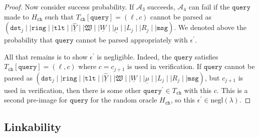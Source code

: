 \documentclass[11pt]{article}
\theoremstyle{definition}
\newcommand{\tlt}{\texttt{tlt}}
\newcommand{\tvk}{\texttt{tvk}}
\newcommand{\ring}{\texttt{ring}}
\newcommand{\secpar}{\lambda}
\newcommand{\msg}{\texttt{msg}}
\newcommand{\negl}{\text{negl}(\secpar)}
\newcommand{\keyOracle}{\mathcal{O}_{\texttt{key}}}
\newcommand{\signaturequery}{(\texttt{dst}_{j} \mid \mid \ring \mid \mid \tlt \mid \mid \underline{\widehat{Y}} \mid \mid \mathfrak{W} \mid \mid \underline{W} \mid \mid \underline{\mu} \mid \mid L_{j} \mid \mid R_{j} \mid \mid \msg)}
\begin{document}
\begin{proof}
Now consider success probability. If $\mathcal{A}_3$ succeeds, $\mathcal{A}_4$ can fail if the $\texttt{query}$ made to $H_{\texttt{ch}}$ such that $T_{\texttt{ch}}[\texttt{query}]=(\ell, c)$ cannot be parsed as $\signaturequery$. We denoted above the probability that $\texttt{query}$ cannot be parsed appropriately with $\epsilon^\prime$.

All that remains is to show $\epsilon^\prime$ is negligible. Indeed, the $\texttt{query}$ satisfies $T_{\texttt{ch}}[\texttt{query}]=(\ell, c)$ where $c=c_{j+1}$ is used in verification.  If $\texttt{query}$ cannot be parsed as $\signaturequery$, but $c_{j+1}$ is used in verification, then there is some other $\texttt{query}^\prime \in T_{\texttt{ch}}$ with this $c$. This is a second pre-image for $\texttt{query}$ for the random oracle $H_{\texttt{ch}}$, so this $\epsilon^\prime \in \negl$.
\end{proof}



\subsection{Linkability}
\end{document}
